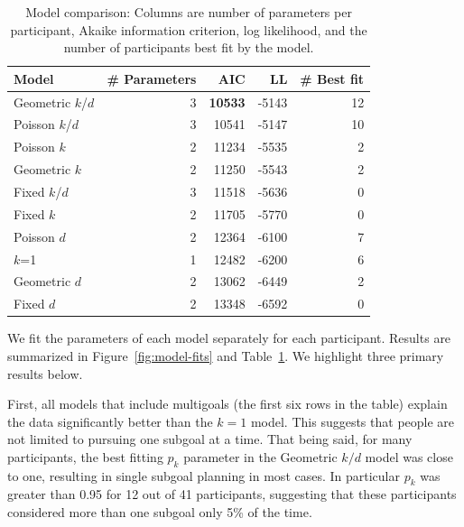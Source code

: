 \documentclass[10pt,letterpaper]{article}
\begin{document}
\begin{table}[t!]
  \centering
  \begin{tabular}{lrrrr}
  \toprule
  Model         & \# Parameters & AIC   & LL    & \# Best fit \\
  \midrule
  Geometric $k$/$d$ & 3 & \textbf{10533} & -5143 & 12 \\
  Poisson $k$/$d$ & 3 & 10541 & -5147 & 10 \\
  Poisson $k$ & 2 & 11234 & -5535 & 2 \\
  Geometric $k$ & 2 & 11250 & -5543 & 2 \\
  Fixed $k$/$d$ & 3 & 11518 & -5636 & 0 \\
  Fixed $k$ & 2 & 11705 & -5770 & 0 \\
  Poisson $d$ & 2 & 12364 & -6100 & 7 \\
  $k$=1 & 1 & 12482 & -6200 & 6 \\
  Geometric $d$ & 2 & 13062 & -6449 & 2 \\
  Fixed $d$ & 2 & 13348 & -6592 & 0 \\
  \bottomrule
  \end{tabular}
  \caption{Model comparison: Columns are number of parameters per participant, Akaike information criterion, log likelihood, and the number of participants best fit by the model.}
  \label{tab:model-fits}
\end{table}

We fit the parameters of each model separately for each participant. Results are summarized in Figure~\ref{fig:model-fits} and Table~\ref{tab:model-fits}. We highlight three primary results below.

First, all models that include multigoals (the first six rows in the table) explain the data significantly better than the $k=1$ model. This suggests that people are not limited to pursuing one subgoal at a time. That being said, for many participants, the best fitting $p_k$ parameter in the Geometric $k/d$ model was close to one, resulting in single subgoal planning in most cases. In particular $p_k$ was greater than 0.95 for 12 out of 41 participants, suggesting that these participants considered more than one subgoal only 5\% of the time.

\end{document}
